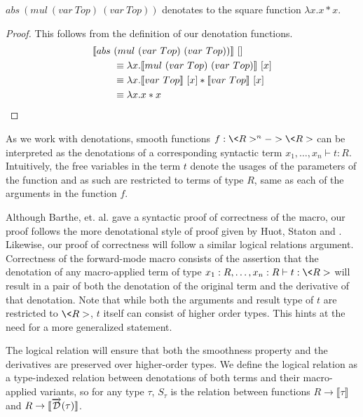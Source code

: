   \begin{example}[Square]
    $abs\ (mul\ (var\ Top)\ (var\ Top))$ denotates to the square function $\lambda x. x * x$.
    \begin{proof}
      This follows from the definition of our denotation functions.
      \begin{align*}
        \llbracket abs\ &(mul\ (var\ Top)\ (var\ Top)) \rrbracket\ [] \\
          &\equiv \lambda x.
            \llbracket mul\ (var\ Top)\ (var\ Top) \rrbracket\ [x] \\
          &\equiv \lambda x.
            \llbracket var\ Top \rrbracket\ [x] *
              \llbracket var\ Top \rrbracket\ [x] \\
          &\equiv \lambda x. x * x \qedhere
      \end{align*}
    \end{proof}
  \end{example}


  As we work with denotations, smooth functions $f : \<R>^n -> \<R>$ can be interpreted as the denotations of a corresponding syntactic term $x_1, \dots, x_n \vdash t : R$.
  Intuitively, the free variables in the term $t$ denote the usages of the parameters of the function and as such are restricted to terms of type $R$, same as each of the arguments in the function $f$.

  Although Barthe, et. al.\cite{barthe2020versatility} gave a syntactic proof of correctness of the macro, our proof follows the more denotational style of proof given by Huot, Staton and \Vakar{}\cite{huot2020correctness}.
  Likewise, our proof of correctness will follow a similar logical relations argument.
  Correctness of the forward-mode macro consists of the assertion that the denotation of any macro-applied term of type $x_1 : R, \dots, x_n : R \vdash t : \<R>$ will result in a pair of both the denotation of the original term and the derivative of that denotation.
  Note that while both the arguments and result type of $t$ are restricted to $\<R>$, $t$ itself can consist of higher order types.
  This hints at the need for a more generalized statement.

  The logical relation will ensure that both the smoothness property and the derivatives are preserved over higher-order types.
  We define the logical relation as a type-indexed relation between denotations of both terms and their macro-applied variants, so for any type $\tau$, $S_\tau$ is the relation between functions $R \rightarrow \llbracket \tau \rrbracket$ and $R \rightarrow \llbracket \overrightarrow{\mathcal{D}}(\tau) \rrbracket$.

